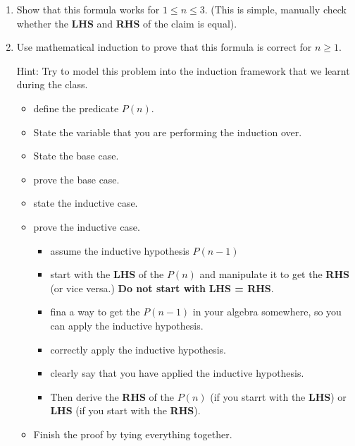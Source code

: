 \documentclass[12pt]{exam}
\begin{document}
\begin{enumerate}
    \item Show that this formula works for $1 \leq n \leq 3$. (This is simple, manually check whether the \textbf{LHS} and \textbf{RHS} of the claim is equal).
    \item Use mathematical induction to prove that this formula is correct for $n \geq 1$.

    Hint: Try to model this problem into the induction framework that we learnt during the class. 
    \begin{itemize}
        \item define the predicate $P(n)$.
        \item State the variable that you are performing the induction over.
        \item State the base case.
        \item prove the base case.
        \item state the inductive case.
        \item prove the inductive case.
            \begin{itemize}
                \item assume the inductive hypothesis $P(n-1)$
                \item start with the \textbf{LHS} of the $P(n)$ and manipulate it to get the \textbf{RHS} (or vice versa.) \textbf{Do not start with }\textbf{LHS = RHS}.
                \item fina a way to get the $P(n-1)$ in your algebra somewhere, so you can apply the inductive hypothesis.
                \item correctly apply the inductive hypothesis.
                \item clearly say that you have applied the inductive hypothesis.
                \item Then derive the \textbf{RHS} of the $P(n)$ (if you starrt with the \textbf{LHS}) or \textbf{LHS} (if you start with the \textbf{RHS}).
            \end{itemize}
        \item Finish the proof by tying everything together.
    \end{itemize}
\end{enumerate}
\end{document}
